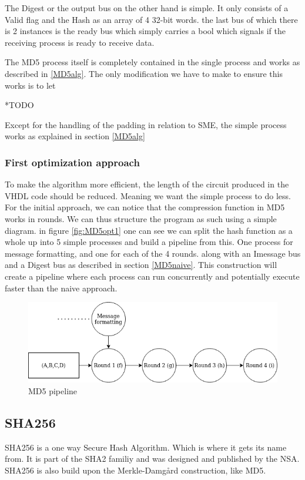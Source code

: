 \documentclass[a4paper]{article}
\begin{document}
The Digest or the output bus on the other hand is simple. It only consists of a Valid flag and the Hash as an array of 4 32-bit words.
the last bus of which there is 2 instances is the ready bus which simply carries a bool which signals if the receiving process is ready to receive data.

The MD5 process itself is completely contained in the single process and works as described in \ref{MD5alg}. The only modification we have to make to ensure this works is to let

*TODO

Except for the handling of the padding in relation to SME, the simple process works as explained in section \ref{MD5alg}

\subsubsection{First optimization approach}
\label{sec:orgeca3760}
To make the algorithm more efficient, the length of the circuit produced in the VHDL code should be reduced. Meaning we want the simple process to do less. For the initial approach, we can notice that the compression function in MD5 works in rounds. We can thus structure the program as such using a simple diagram. in figure \ref{fig:MD5opt1} one can see we can split the hash function as a whole up into 5 simple processes and build a pipeline from this. One process for message formatting, and one for each of the 4 rounds. along with an Imessage bus and a Digest bus as described in section \ref{MD5naive}. This construction will create a pipeline where each process can run concurrently and potentially execute faster than the naive approach.
\begin{figure}[H]
\centering
\includegraphics[width=.9\linewidth]{./Implementation/md5.png}
\caption{\label{fig:org12a7fbd}MD5 pipeline}
\end{figure}
\subsection{SHA256}
\label{sec:orgcce2944}
SHA256 is a one way Secure Hash Algorithm. Which is where it gets its name from.
It is part of the SHA2 familiy and was designed and published by the NSA.
SHA256 is also build upon the Merkle-Damgård construction, like MD5.
\end{document}
